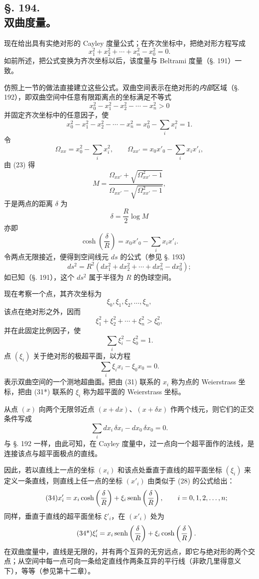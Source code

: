 \subsection*{§. 194.\\ 双曲度量。}

现在给出具有实绝对形的 Cayley 度量公式；在齐次坐标中，把绝对形方程写成
\[
 x_1^2+x_2^2+\cdots+x_n^2-x_0^2=0.
\]
如前所述，把公式变换为齐次坐标以后，该度量与 Beltrami 度量（§. 191）一致。

仿照上一节的做法直接建立这些公式。双曲空间表示在绝对形的\emph{内部}区域（§. 192），即双曲空间中任意有限距离点的坐标满足不等式
\[
 x_0^2-x_1^2-x_2^2-\cdots-x_n^2>0
\]
并固定齐次坐标中的任意因子，使
\[
\tag{31}
 x_0^2-x_1^2-x_2^2-\cdots-x_n^2=x_0^2-\sum_i x_i^2=1.
\]
令
\[
 \Omega_{xx}=x_0^2-\sum_i x_i^2,
 \qquad \Omega_{xx'}=x_0x'_0-\sum_i x_ix'_i,
\]
由 (23) 得
\[
 M=\frac{\Omega_{xx'}+\sqrt{\Omega_{xx'}^2-1}}
 {\Omega_{xx'}-\sqrt{\Omega_{xx'}^2-1}},
\]
于是两点的距离 $\delta$ 为
\[
 \delta=\frac R2\log M
\]
亦即
\[
\tag{32}
 \cosh\left(\frac\delta R\right)=x_0x'_0-\sum_i x_ix'_i.
\]
令两点无限接近，便得到空间线元 $ds$ 的公式（参见 §. 193）
\[
 ds^2=R^2(dx_1^2+dx_2^2+\cdots+dx_n^2-dx_0^2);
\]
如已知（§. 191），这个 $ds^2$ 属于半径为 $R$ 的伪球空间。

现在考察一个点，其齐次坐标为
\[
 \xi_0,\xi_1,\xi_2,\ldots,\xi_n,
\]
该点在绝对形之外，因而
\[
 \xi_1^2+\xi_2^2+\cdots+\xi_n^2>\xi_0^2,
\]
并在此固定比例因子，使
\[
\tag{31*}
 \sum_i\xi_i^2-\xi_0^2=1.
\]
点 $(\xi_i)$ 关于绝对形的极超平面，以方程
\[
\tag{33}
 \sum_i\xi_i x_i-\xi_0x_0=0.
\]
表示双曲空间的一个测地超曲面。把由 (31) 联系的 $x_i$ 称为点的 Weierstrass 坐标，把由 (31*) 联系的 $\xi_i$ 称为超平面的 Weierstrass 坐标。

从点 $(x)$ 向两个无限邻近点 $(x+dx)$、$(x+\delta x)$ 作两个线元，则它们的正交条件写成
\[
 \sum_i dx_i\,\delta x_i-dx_0\,\delta x_0=0.
\]
与 §. 192 一样，由此可知，在 Cayley 度量中，过一点向一个超平面作的法线，是连接该点与超平面极点的直线。

因此，若以直线上一点的坐标 $(x_i)$ 和该点处垂直于直线的超平面坐标 $(\xi_i)$ 来定义一条直线，则直线上任一点的坐标 $(x'_i)$ 由类似于 (28) 的公式给出：
\[
\tag{34}
 x'_i=x_i\cosh\left(\frac\delta R\right)+\xi_i\operatorname{senh}\left(\frac\delta R\right),
 \qquad i=0,1,2,\ldots,n;
\]
同样，垂直于直线的超平面坐标 $\xi'_i$，在 $(x'_i)$ 处为
\[
\tag{34*}
 \xi'_i=x_i\operatorname{senh}\left(\frac\delta R\right)+\xi_i\cosh\left(\frac\delta R\right).
\]
在双曲度量中，直线是无限的，并有两个互异的无穷远点，即它与绝对形的两个交点；从空间中每一点可向一条给定直线作两条互异的平行线（非欧几里得意义下），等等（参见第十二章）。

